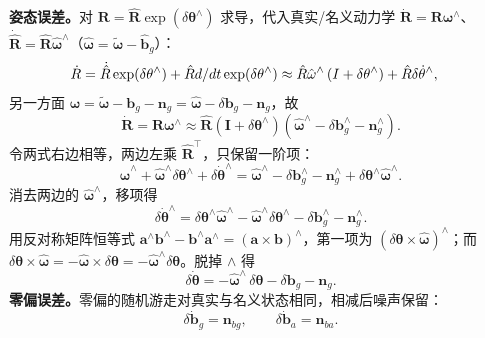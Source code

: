 \textbf{姿态误差。}对 $\bm{R}=\hat{\bm{R}}\exp(\delta\bm{\theta}^{\wedge})$ 求导，代入真实/名义动力学 $\dot{\bm{R}}=\bm{R}\bm{\omega}^{\wedge}$、$\dot{\hat{\bm{R}}}=\hat{\bm{R}}\hat{\bm{\omega}}^{\wedge}$（$\hat{\bm{\omega}}=\tilde{\bm{\omega}}-\hat{\bm{b}}_g$）：
\begin{align}
  \dot{R} &= \dot{\hat{R}}\exp(\delta\theta^{\wedge})
                 +\hat{R}d/d t\exp(\delta\theta^{\wedge})
  \approx \hat{R}\hat{\omega}^{\wedge}\left(I+\delta\theta^{\wedge}\right)
  +\hat{R}\delta\dot{\theta}^{\wedge},
\end{align}
另一方面 $\bm{\omega}=\tilde{\bm{\omega}}-\bm{b}_g-\bm{n}_g=\hat{\bm{\omega}}-\delta\bm{b}_g-\bm{n}_g$，故
\begin{equation}
  \dot{\bm{R}} = \bm{R}\bm{\omega}^{\wedge}
  \approx \hat{\bm{R}}\left(\bm{I}+\delta\bm{\theta}^{\wedge}\right)
  \left(\hat{\bm{\omega}}^{\wedge}-\delta\bm{b}_g^{\wedge}-\bm{n}_g^{\wedge}\right).
\end{equation}
令两式右边相等，两边左乘 $\hat{\bm{R}}^{\top}$，只保留一阶项：
\begin{equation}
  \hat{\bm{\omega}}^{\wedge}+\hat{\bm{\omega}}^{\wedge}\delta\bm{\theta}^{\wedge}+\delta\dot{\bm{\theta}}^{\wedge}
  = \hat{\bm{\omega}}^{\wedge}-\delta\bm{b}_g^{\wedge}-\bm{n}_g^{\wedge}
    +\delta\bm{\theta}^{\wedge}\hat{\bm{\omega}}^{\wedge}.
\end{equation}
消去两边的 $\hat{\bm{\omega}}^{\wedge}$，移项得
\begin{equation}
  \delta\dot{\bm{\theta}}^{\wedge}
  = \delta\bm{\theta}^{\wedge}\hat{\bm{\omega}}^{\wedge}-\hat{\bm{\omega}}^{\wedge}\delta\bm{\theta}^{\wedge}
    -\delta\bm{b}_g^{\wedge}-\bm{n}_g^{\wedge}.
\end{equation}
用反对称矩阵恒等式 $\bm{a}^{\wedge}\bm{b}^{\wedge}-\bm{b}^{\wedge}\bm{a}^{\wedge}=(\bm{a}\times\bm{b})^{\wedge}$，第一项为 $(\delta\bm{\theta}\times\hat{\bm{\omega}})^{\wedge}$；而 $\delta\bm{\theta}\times\hat{\bm{\omega}}=-\hat{\bm{\omega}}\times\delta\bm{\theta}=-\hat{\bm{\omega}}^{\wedge}\delta\bm{\theta}$。脱掉 $\wedge$ 得
\begin{equation}
  \delta\dot{\bm{\theta}} = -\hat{\bm{\omega}}^{\wedge}\,\delta\bm{\theta}-\delta\bm{b}_g-\bm{n}_g.
  \label{eq:06-dtheta}
\end{equation}
\textbf{零偏误差。}零偏的随机游走对真实与名义状态相同，相减后噪声保留：
\begin{equation}
  \delta\dot{\bm{b}}_g = \bm{n}_{bg},
  \qquad
  \delta\dot{\bm{b}}_a = \bm{n}_{ba}.
  \label{eq:06-dbias}
\end{equation}

